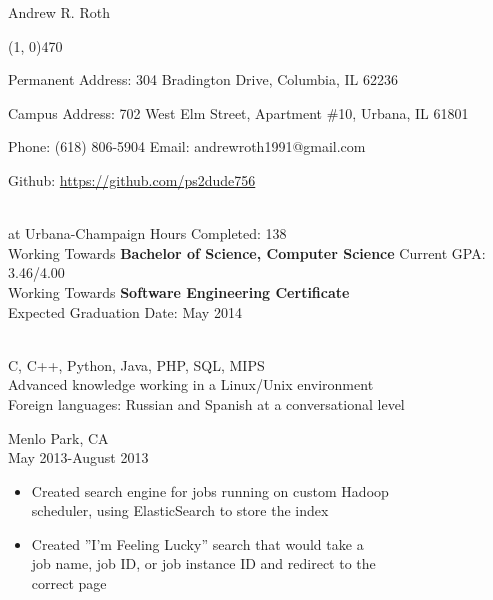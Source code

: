 \documentclass[11pt]{article}
\begin{document}
  \centerline{{\Huge \sc Andrew R. Roth}}
  \noindent\line(1, 0){470}\\
  \centerline{
    Permanent Address:
      304 Bradington Drive,
      Columbia,
      IL 62236
  }
  \centerline{
    Campus Address:
      702 West Elm Street,
      Apartment \#10,
      Urbana,
      IL 61801
  }
  \centerline{
    Phone: (618) 806-5904
    \indent Email: andrewroth1991@gmail.com
  }
  \centerline{
    Github: \url{https://github.com/ps2dude756}
  }

  \bigskip

  \\
     at Urbana-Champaign \hfill 
      Hours Completed: 138\\
    \indent Working Towards {\bf Bachelor of Science, Computer Science} \hfill 
      Current GPA: 3.46/4.00\\
    \indent Working Towards {\bf Software Engineering Certificate}\\
    \indent Expected Graduation Date: May 2014

  \bigskip

  \\
    \indent C, C++, Python, Java, PHP, SQL, MIPS\\
    \indent Advanced knowledge working in a Linux/Unix environment\\
    \indent Foreign languages: Russian and Spanish at a conversational level

  \bigskip

    \smallskip

     \hfill Menlo Park, CA\\
     \hfill May 2013-August 2013
    \begin{itemize}[noitemsep,topsep=0pt,leftmargin=52pt]
      \item Created search engine for jobs running on custom Hadoop\\
        scheduler, using ElasticSearch to store the index
      \item Created ''I'm Feeling Lucky'' search that would take a\\
        job name, job ID, or job instance ID and redirect to the\\
        correct page
    \end{itemize}
    \medskip
\end{document}
